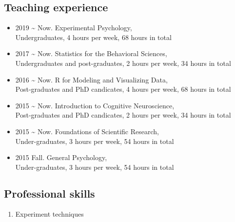 \documentclass[12pt,]{article}
\providecommand{\tightlist}{%
  \setlength{\itemsep}{0pt}\setlength{\parskip}{0pt}}
\begin{document}
\hypertarget{teaching-experience}{%
\subsection{Teaching experience}\label{teaching-experience}}

\begin{itemize}
\item
  2019 \textasciitilde{} Now. Experimental Psychology, \\
  Undergraduates, 4 hours per week, 68 hours in total
\item
  2017 \textasciitilde{} Now. Statistics for the Behavioral Sciences, \\
  Undergraduates and post-graduates, 2 hours per week, 34 hours in total
\item
  2016 \textasciitilde{} Now. R for Modeling and Visualizing Data, \\
  Post-graduates and PhD candicates, 4 hours per week, 68 hours in total
\item
  2015 \textasciitilde{} Now. Introduction to Cognitive Neuroscience, \\
  Post-graduates and PhD candicates, 2 hours per week, 34 hours in total
\item
  2015 \textasciitilde{} Now. Foundations of Scientific Research, \\
  Under-graduates, 3 hours per week, 54 hours in total
\item
  2015 Fall. General Psychology, \\
  Under-graduates, 3 hours per week, 54 hours in total
\end{itemize}

\hypertarget{professional-skills}{%
\subsection{Professional skills}\label{professional-skills}}

\begin{enumerate}
\def\labelenumi{\arabic{enumi}.}
\tightlist
\item
  Experiment techniques
\end{enumerate}
\end{document}
